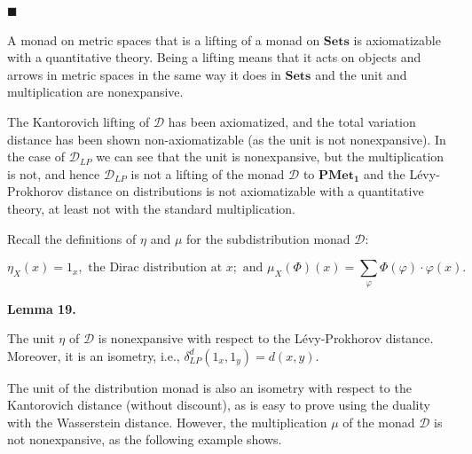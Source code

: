 \documentclass[10pt,a4paper]{article}
\begin{document}
 
\par\noindent  $\blacksquare$ 
 
A monad on metric spaces that is a lifting of a monad on $\mathbf{Sets}$ is axiomatizable with a quantitative theory. Being a lifting means that it acts on objects and arrows in metric spaces in the same way it does in $\mathbf{Sets}$ and the unit and multiplication are nonexpansive.\par
 
 
  
The Kantorovich lifting of $\mathcal{D}$ has been axiomatized, and the total variation distance has been shown non-axiomatizable (as the unit is not nonexpansive). In the case of $\mathcal{D}_{LP}$ we can see that the unit is nonexpansive, but the multiplication is not, and hence $\mathcal{D}_{LP}$ is not a lifting of the monad $\mathcal{D}$ to $\mathbf{PMet_{1}}$ and the Lévy-Prokhorov distance on distributions is not axiomatizable with a quantitative theory, at least not with the standard multiplication.\par
 
 
 
Recall the definitions of $\eta$ and $\mu$ for the subdistribution monad $\mathcal{D}$:\par
  
\par  \quad  \[\eta_{X}(x)=1_{x},\text{ the Dirac distribution at }x;\text{ and }\mu_{X}(\Phi)(x)=\sum_{\varphi}\Phi(\varphi)\cdot\varphi(x).\]\quad  \quad  
  
 
 
\par\medskip\noindent\textbf{Lemma 19.}\par
 
 
The unit $\eta$ of $\mathcal{D}$ is nonexpansive with respect to the Lévy-Prokhorov distance. Moreover, it is an isometry, i.e., $\delta_{LP}^{d}(1_{x},1_{y})=d(x,y)$.\par
 
 
 
 
The unit of the distribution monad is also an isometry with respect to the Kantorovich distance (without discount), as is easy to prove using the duality with the Wasserstein distance. However, the multiplication $\mu$ of the monad $\mathcal{D}$ is not nonexpansive, as the following example shows.\par
 
\end{document}
